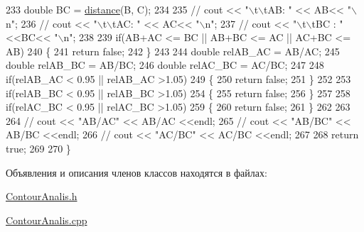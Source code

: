\begin{DoxyCode}
233     \textcolor{keywordtype}{double} BC = \hyperlink{class_contour_analis_a4f99f88069c6a746805275d21acdf5b2}{distance}(B, C);
234 
235 \textcolor{comment}{//    cout << "\(\backslash\)t\(\backslash\)tAB: " << AB<< "\(\backslash\)n";}
236 \textcolor{comment}{//    cout << "\(\backslash\)t\(\backslash\)tAC: " << AC<< "\(\backslash\)n";}
237 \textcolor{comment}{//    cout << "\(\backslash\)t\(\backslash\)tBC : " <<BC<< "\(\backslash\)n";}
238 
239     \textcolor{keywordflow}{if}(AB+AC <= BC || AB+BC <= AC || AC+BC <= AB)
240     \{
241         \textcolor{keywordflow}{return} \textcolor{keyword}{false};
242     \}
243 
244     \textcolor{keywordtype}{double} relAB\_AC = AB/AC;
245     \textcolor{keywordtype}{double} relAB\_BC = AB/BC;
246     \textcolor{keywordtype}{double} relAC\_BC = AC/BC;
247 
248     \textcolor{keywordflow}{if}(relAB\_AC < 0.95 || relAB\_AC >1.05)
249     \{
250         \textcolor{keywordflow}{return} \textcolor{keyword}{false};
251     \}
252 
253     \textcolor{keywordflow}{if}(relAB\_BC < 0.95 || relAB\_BC >1.05)
254     \{
255         \textcolor{keywordflow}{return} \textcolor{keyword}{false};
256     \}
257 
258     \textcolor{keywordflow}{if}(relAC\_BC < 0.95 ||  relAC\_BC >1.05)
259     \{
260         \textcolor{keywordflow}{return} \textcolor{keyword}{false};
261     \}
262 
263 
264 \textcolor{comment}{//    cout << "AB/AC" << AB/AC <<endl;}
265 \textcolor{comment}{//    cout << "AB/BC" << AB/BC <<endl;}
266 \textcolor{comment}{//    cout << "AC/BC" << AC/BC <<endl;}
267 
268     \textcolor{keywordflow}{return} \textcolor{keyword}{true};
269 
270 \}
\end{DoxyCode}


Объявления и описания членов классов находятся в файлах\+:\begin{DoxyCompactItemize}
\item 
\hyperlink{_contour_analis_8h}{Contour\+Analis.\+h}\item 
\hyperlink{_contour_analis_8cpp}{Contour\+Analis.\+cpp}\end{DoxyCompactItemize}
